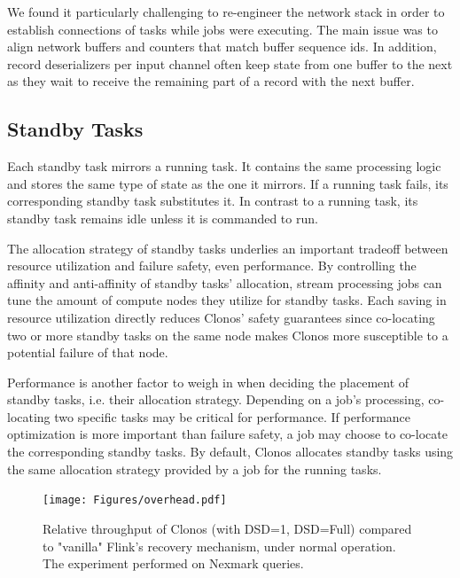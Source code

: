 \documentclass[sigconf]{acmart}
\begin{document}
We found it particularly challenging to re-engineer the network stack in order to establish connections of tasks while jobs were executing. The main issue was to align network buffers and counters that match buffer sequence ids. In addition, record deserializers per input channel often keep state from one buffer to the next as they wait to receive the remaining part of a record with the next buffer.



\subsection{Standby Tasks}

Each standby task mirrors a running task.
It contains the same processing logic and stores the same type of state as the one it mirrors.
If a running task fails, its corresponding standby task substitutes it.
In contrast to a running task, its standby task remains idle unless it is commanded to run.

The allocation strategy of standby tasks underlies an important tradeoff between resource utilization and failure safety, even performance.
By controlling the affinity and anti-affinity of standby tasks' allocation, stream processing jobs can tune the amount of compute nodes they utilize for standby tasks.
Each saving in resource utilization directly reduces Clonos' safety guarantees since co-locating two or more standby tasks on the same node makes Clonos more susceptible to a potential failure of that node.

Performance is another factor to weigh in when deciding the placement of standby tasks, i.e. their allocation strategy.
Depending on a job's processing, co-locating two specific tasks may be critical for performance.
If performance optimization is more important than failure safety, a job may choose to co-locate the corresponding standby tasks.
By default, Clonos allocates standby tasks using the same allocation strategy provided by a job for the running tasks.


\begin{figure}[t]
    \centering
    \texttt{[image: Figures/overhead.pdf]}
		\caption{Relative throughput of Clonos (with DSD=1, DSD=Full) compared to "vanilla" Flink's recovery mechanism, under normal operation. The experiment performed on Nexmark queries.}
\label{fig:overhead-nexmark}
\vspace{-2mm}
\end{figure}
\end{document}
